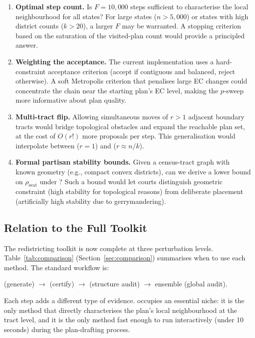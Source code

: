 \begin{enumerate}
  \item \textbf{Optimal step count.} Is $F = 10{,}000$ steps sufficient to
        characterise the local neighbourhood for all states?
        For large states ($n > 5{,}000$) or states with high district counts
        ($k > 20$), a larger $F$ may be warranted.
        A stopping criterion based on the saturation of the visited-plan count
        would provide a principled answer.

  \item \textbf{Weighting the acceptance.} The current \flip{} implementation
        uses a hard-constraint acceptance criterion (accept if contiguous and
        balanced, reject otherwise).
        A soft Metropolis criterion that penalises large EC changes could
        concentrate the chain near the starting plan's EC level, making the
        $p$-sweep more informative about plan quality.

  \item \textbf{Multi-tract flip.} Allowing simultaneous moves of $r > 1$
        adjacent boundary tracts would bridge topological obstacles and
        expand the reachable plan set, at the cost of $O(r!)$ more proposals
        per step.
        This generalisation would interpolate between \flip{} ($r = 1$)
        and \recom{} ($r \approx n/k$).

  \item \textbf{Formal partisan stability bounds.} Given a census-tract graph
        with known geometry (e.g., compact convex districts), can we derive
        a lower bound on $\rho_{\mathrm{seat}}$ under \flip{}?
        Such a bound would let courts distinguish geometric constraint
        (high stability for topological reasons) from deliberate placement
        (artificially high stability due to gerrymandering).
\end{enumerate}

\subsection{Relation to the Full Toolkit}

The redistricting toolkit is now complete at three perturbation levels.
Table~\ref{tab:comparison} (Section~\ref{sec:comparison}) summarises when
to use each method.
The standard workflow is:
\begin{center}
  \cs{} (generate) $\to$ \flip{} (certify) $\to$ \be{} (structure audit)
  $\to$ ensemble (global audit).
\end{center}
Each step adds a different type of evidence.
\flip{} occupies an essential niche: it is the only method that directly
characterises the plan's local neighbourhood at the tract level, and it is
the only method fast enough to run interactively (under 10 seconds) during
the plan-drafting process.
